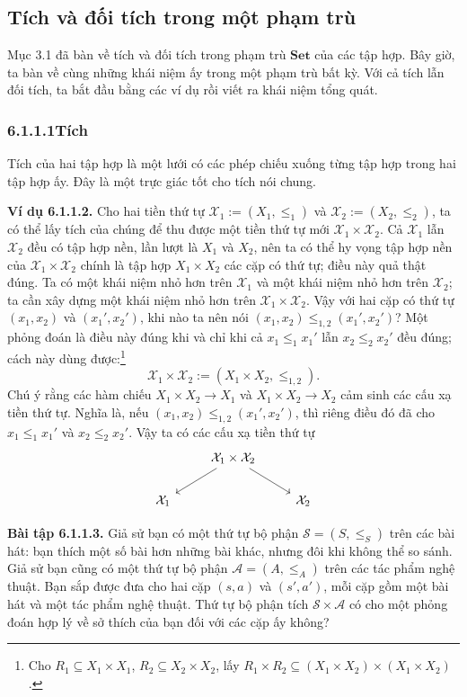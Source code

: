 \subsection{Tích và đối tích trong một phạm trù}
Mục 3.1 đã bàn về tích và đối tích trong phạm trù $\mathbf{Set}$ của các tập hợp. Bây giờ, ta bàn về cùng những khái niệm ấy trong một phạm trù bất kỳ. Với cả tích lẫn đối tích, ta bắt đầu bằng các ví dụ rồi viết ra khái niệm tổng quát.

\subsubsection*{6.1.1.1\quad Tích}
Tích của hai tập hợp là một lưới có các phép chiếu xuống từng tập hợp trong hai tập hợp ấy. Đây là một trực giác tốt cho tích nói chung.

\noindent\textbf{Ví dụ 6.1.1.2.} Cho hai tiền thứ tự $\mathcal X_1:=(X_1,\le_1)$ và $\mathcal X_2:=(X_2,\le_2)$, ta có thể lấy tích của chúng để thu được một tiền thứ tự mới $\mathcal X_1\times\mathcal X_2$. Cả $\mathcal X_1$ lẫn $\mathcal X_2$ đều có tập hợp nền, lần lượt là $X_1$ và $X_2$, nên ta có thể hy vọng tập hợp nền của $\mathcal X_1\times\mathcal X_2$ chính là tập hợp $X_1\times X_2$ các cặp có thứ tự; điều này quả thật đúng. Ta có một khái niệm nhỏ hơn trên $\mathcal X_1$ và một khái niệm nhỏ hơn trên $\mathcal X_2$; ta cần xây dựng một khái niệm nhỏ hơn trên $\mathcal X_1\times\mathcal X_2$. Vậy với hai cặp có thứ tự $(x_1,x_2)$ và $(x_1',x_2')$, khi nào ta nên nói $(x_1,x_2)\le_{1,2}(x_1',x_2')$? Một phỏng đoán là điều này đúng khi và chỉ khi cả $x_1\le_1x_1'$ lẫn $x_2\le_2x_2'$ đều đúng; cách này dùng được:\footnote{Cho $R_1\subseteq X_1\times X_1$, $R_2\subseteq X_2\times X_2$, lấy $R_1\times R_2\subseteq(X_1\times X_2)\times(X_1\times X_2)$.}
\[\mathcal X_1\times\mathcal X_2:=(X_1\times X_2,\le_{1,2}).\]
Chú ý rằng các hàm chiếu $X_1\times X_2\to X_1$ và $X_1\times X_2\to X_2$ cảm sinh các cấu xạ tiền thứ tự. Nghĩa là, nếu $(x_1,x_2)\le_{1,2}(x_1',x_2')$, thì riêng điều đó đã cho $x_1\le_1x_1'$ và
$x_2\le_2x_2'$. Vậy ta có các cấu xạ tiền thứ tự
\[\begin{tikzcd}&\mathcal X_1\times\mathcal X_2\arrow[dl]\arrow[dr]&\\\mathcal X_1&&\mathcal X_2\end{tikzcd}\]

\noindent\textbf{Bài tập 6.1.1.3.} Giả sử bạn có một thứ tự bộ phận $\mathcal S=(S,\le_S)$ trên các bài hát: bạn thích một số bài hơn những bài khác, nhưng đôi khi không thể so sánh. Giả sử bạn cũng có một thứ tự bộ phận $\mathcal A=(A,\le_A)$ trên các tác phẩm nghệ thuật. Bạn sắp được đưa cho hai cặp $(s,a)$ và $(s',a')$, mỗi cặp gồm một bài hát và một tác phẩm nghệ thuật. Thứ tự bộ phận tích $\mathcal S\times\mathcal A$ có cho một phỏng đoán hợp lý về sở thích của bạn đối với các cặp ấy không?

